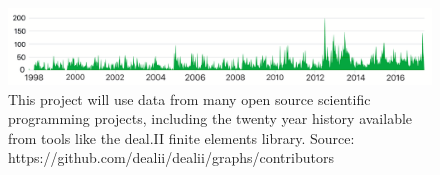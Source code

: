 \begin{figure}[ht!]
\centering
\includegraphics[width=\linewidth]{figs/commits.png}
\caption{This project will use data from many open source scientific programming projects, including the twenty year history available from tools like the deal.II finite elements library. Source: https://github.com/dealii/dealii/graphs/contributors}
\label{fig:commits}
\end{figure}